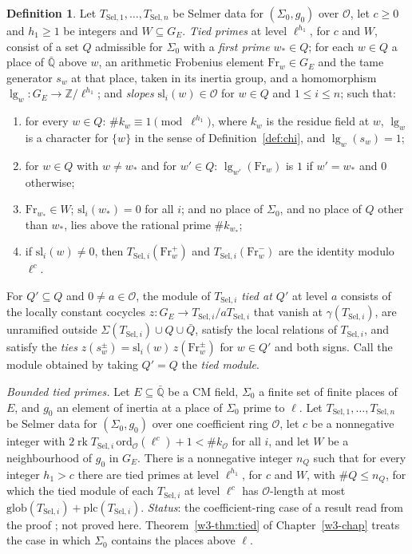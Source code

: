 \documentclass[reqno]{amsart}
\newcounter{chap}
\theoremstyle{definition}
\newtheorem{definition}{Definition}[section]
\theoremstyle{plain}
\newcommand{\Z}{\mathbb{Z}}
\newcommand{\Q}{\mathbb{Q}}
\newcommand{\ord}{\mathrm{ord}}
\newcommand{\rk}{\operatorname{rk}}
\newcommand{\Oc}{\mathcal{O}}
\newcommand{\Fr}{\mathrm{Fr}}
\newcommand{\sla}{\mathrm{sl}}
\newcommand{\Ti}{T_{\mathrm{Sel},i}}
\begin{document}
\begin{definition}\label{def:tied}
Let \(T_{\mathrm{Sel},1}, \dots, T_{\mathrm{Sel},n}\) be Selmer data for \((\Sigma_0, g_0)\) over \(\Oc\), let \(c \ge 0\) and \(h_1 \ge 1\) be integers and \(W \subseteq G_E\).  \emph{Tied primes} at level \(\ell^{h_1}\), for \(c\) and \(W\), consist of a set \(Q\) admissible for \(\Sigma_0\) with a \emph{first prime} \(w_* \in Q\); for each \(w \in Q\) a place of \(\bar{\Q}\) above \(w\), an arithmetic Frobenius element \(\Fr_w \in G_E\) and the tame generator \(s_w\) at that place, taken in its inertia group, and a homomorphism \(\lg_w \colon G_E \to \Z/\ell^{h_1}\); and \emph{slopes} \(\sla_i(w) \in \Oc\) for \(w \in Q\) and \(1 \le i \le n\); such that:
\begin{enumerate}
\item[(a)] for every \(w \in Q\): \(\#k_w \equiv 1 \pmod{\ell^{h_1}}\), where \(k_w\) is the residue field at \(w\), \(\lg_w\) is a character for \(\{w\}\) in the sense of Definition~\ref{def:chi}, and \(\lg_w(s_w) = 1\);
\item[(b)] for \(w \in Q\) with \(w \ne w_*\) and for \(w' \in Q\): \(\lg_{w'}(\Fr_w)\) is \(1\) if \(w' = w_*\) and \(0\) otherwise;
\item[(c)] \(\Fr_{w_*} \in W\); \(\sla_i(w_*) = 0\) for all \(i\); and no place of \(\Sigma_0\), and no place of \(Q\) other than \(w_*\), lies above the rational prime \(\#k_{w_*}\);
\item[(d)] if \(\sla_i(w) \ne 0\), then \(\Ti(\Fr_w^{+})\) and \(\Ti(\Fr_w^{-})\) are the identity modulo \(\ell^{c}\).
\end{enumerate}
For \(Q' \subseteq Q\) and \(0 \ne a \in \Oc\), the module of \(\Ti\) \emph{tied at \(Q'\)} at level \(a\) consists of the locally constant cocycles \(z \colon G_E \to \Ti/a\Ti\) that vanish at \(\gamma(\Ti)\), are unramified outside \(\Sigma(\Ti) \cup Q \cup \bar Q\), satisfy the local relations of \(\Ti\), and satisfy the \emph{ties} \(z(s_w^{\pm}) = \sla_i(w)\, z(\Fr_w^{\pm})\) for \(w \in Q'\) and both signs.  Call the module obtained by taking \(Q' = Q\) the \emph{tied module}.
\end{definition}

\emph{Bounded tied primes.}  Let \(E \subseteq \bar{\Q}\) be a CM field, \(\Sigma_0\) a finite set of finite places of \(E\), and \(g_0\) an element of inertia at a place of \(\Sigma_0\) prime to \(\ell\).  Let \(T_{\mathrm{Sel},1}, \dots, T_{\mathrm{Sel},n}\) be Selmer data for \((\Sigma_0, g_0)\) over one coefficient ring \(\Oc\), let \(c\) be a nonnegative integer with \(2\rk \Ti\,\ord_{\Oc}(\ell^{c}) + 1 < \#k_{\Oc}\) for all \(i\), and let \(W\) be a neighbourhood of \(g_0\) in \(G_E\).  There is a nonnegative integer \(n_Q\) such that for every integer \(h_1 > c\) there are tied primes at level \(\ell^{h_1}\), for \(c\) and \(W\), with \(\#Q \le n_Q\), for which the tied module of each \(\Ti\) at level \(\ell^{c}\) has \(\Oc\)-length at most \(\mathrm{glob}(\Ti) + \mathrm{plc}(\Ti)\).  \emph{Status}: the coefficient-ring case of a result read from the proof \cite{GL}; not proved here.  Theorem~\ref{w3-thm:tied} of Chapter~\ref{w3-chap} treats the case in which \(\Sigma_0\) contains the places above \(\ell\).
\end{document}
